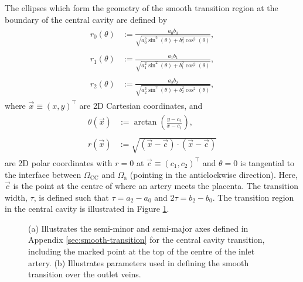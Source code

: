     The ellipses which form the geometry of the smooth transition region at the boundary of the central cavity are defined by
    \begin{align}
        \begin{split}
            r_0(\theta) & := \frac{a_0 b_0}{\sqrt{a_0^2 \sin^2(\theta) + b_0^2 \cos^2(\theta)}},
        \end{split}\\
        \begin{split}
            r_1(\theta) & := \frac{a_1 b_1}{\sqrt{a_1^2 \sin^2(\theta) + b_1^2 \cos^2(\theta)}},
        \end{split}\\
        \begin{split}
            r_2(\theta) & := \frac{a_2 b_2}{\sqrt{a_2^2 \sin^2(\theta) + b_2^2 \cos^2(\theta)}},
        \end{split}
    \end{align}
    where $\vec{x} \equiv (x, y)^\intercal$ are 2D Cartesian coordinates, and
    \begin{align}
        \begin{split}
            \theta(\vec{x}) & := \arctan{\left(\frac{y-c_2}{x-c_1}\right)},
        \end{split}\\
        \begin{split}
            r(\vec{x}) & := \sqrt{(\vec{x} - \vec{c}) \cdot (\vec{x} - \vec{c})}
        \end{split}
    \end{align}
    are 2D polar coordinates with $r = 0$ at $\vec{c} \equiv (c_1, c_2)^\intercal$ and $\theta = 0$ is tangential to the interface between $\Omega_\text{CC}$ and $\Omega_\text{a}$ (pointing in the anticlockwise direction). Here, $\vec{c}$ is the point at the centre of where an artery meets the placenta. The transition width, $\tau$, is defined such that $\tau = a_2 - a_0$ and $2\tau = b_2 - b_0$. The transition region in the central cavity is illustrated in Figure \ref{fig:transition-sizes:cavity}.

    \begin{figure}
        \begin{subfigure}[b]{0.45\textwidth}
            \centering
            
            \caption{}
            \label{fig:transition-sizes:cavity}
        \end{subfigure}
        \hfill
        \begin{subfigure}[b]{0.45\textwidth}
            \centering
            
            \caption{}
            \label{fig:transition-sizes:vein}
        \end{subfigure}
        \caption{(a) Illustrates the semi-minor and semi-major axes defined in Appendix \ref{sec:smooth-transition} for the central cavity transition, including the marked point at the top of the centre of the inlet artery. (b) Illustrates parameters used in defining the smooth transition over the outlet veins.}
        \label{fig:transition-sizes}
    \end{figure}

